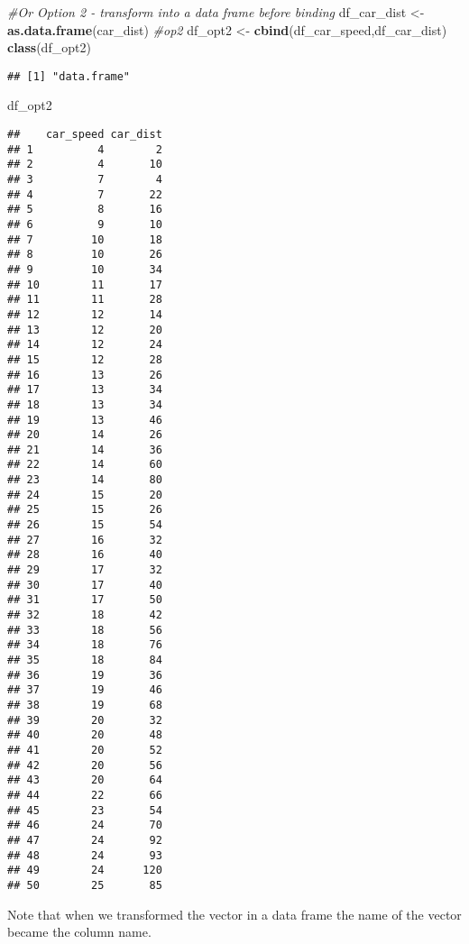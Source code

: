 \documentclass[
]{article}
\newenvironment{Shaded}{\begin{snugshade}}{\end{snugshade}}
\newcommand{\CommentTok}[1]{\textcolor[rgb]{0.56,0.35,0.01}{\textit{#1}}}
\newcommand{\KeywordTok}[1]{\textcolor[rgb]{0.13,0.29,0.53}{\textbf{#1}}}
\newcommand{\NormalTok}[1]{#1}
\newcommand{\StringTok}[1]{\textcolor[rgb]{0.31,0.60,0.02}{#1}}
\begin{document}
\begin{Shaded}
\begin{Highlighting}[]
\CommentTok{#Or Option 2 - transform into a data frame before binding}
\NormalTok{df_car_dist <-}\StringTok{ }\KeywordTok{as.data.frame}\NormalTok{(car_dist)  }\CommentTok{#op2}
\NormalTok{df_opt2 <-}\StringTok{ }\KeywordTok{cbind}\NormalTok{(df_car_speed,df_car_dist)}
\KeywordTok{class}\NormalTok{(df_opt2)}
\end{Highlighting}
\end{Shaded}

\begin{verbatim}
## [1] "data.frame"
\end{verbatim}

\begin{Shaded}
\begin{Highlighting}[]
\NormalTok{df_opt2}
\end{Highlighting}
\end{Shaded}

\begin{verbatim}
##    car_speed car_dist
## 1          4        2
## 2          4       10
## 3          7        4
## 4          7       22
## 5          8       16
## 6          9       10
## 7         10       18
## 8         10       26
## 9         10       34
## 10        11       17
## 11        11       28
## 12        12       14
## 13        12       20
## 14        12       24
## 15        12       28
## 16        13       26
## 17        13       34
## 18        13       34
## 19        13       46
## 20        14       26
## 21        14       36
## 22        14       60
## 23        14       80
## 24        15       20
## 25        15       26
## 26        15       54
## 27        16       32
## 28        16       40
## 29        17       32
## 30        17       40
## 31        17       50
## 32        18       42
## 33        18       56
## 34        18       76
## 35        18       84
## 36        19       36
## 37        19       46
## 38        19       68
## 39        20       32
## 40        20       48
## 41        20       52
## 42        20       56
## 43        20       64
## 44        22       66
## 45        23       54
## 46        24       70
## 47        24       92
## 48        24       93
## 49        24      120
## 50        25       85
\end{verbatim}

Note that when we transformed the vector in a data frame the name of the
vector became the column name.
\end{document}
